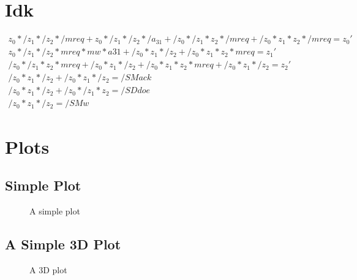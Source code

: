 \documentclass{scrartcl}
\begin{document}
\section{Idk}
\begin{align*}
    z_0*/z_1*/z_2*/mreq + z_0*/z_1*/z_2*/a_{31} + /z_0*/z_1*z_2*/mreq + /z_0*z_1*z_2*/mreq = z_0' \\
    z_0*/z_1*/z_2*mreq*mw*a31 + /z_0*z_1*/z_2 + /z_0*z_1*z_2*mreq = z_1' \\
    /z_0*/z_1*z_2*mreq + /z_0*z_1*/z_2 + /z_0*z_1*z_2*mreq + /z_0*z_1*/z_2 = z_2' \\
    /z_0*z_1*/z_2+/z_0*z_1*/z_2 = /SMack \\
    /z_0*z_1*/z_2+/z_0*/z_1*z_2 = /SDdoe \\
    /z_0*z_1*/z_2 = /SMw
\end{align*}

\section{Plots}
\subsection{Simple Plot}
\noindent
\FloatBarrier
\begin{figure}[ht]
        \centering
        \caption{A simple plot}
        \label{fig:simpleplot}
\end{figure}
\FloatBarrier

\subsection{A Simple 3D Plot}
\noindent
\FloatBarrier
\begin{figure}[ht]
        \centering
        \caption{A 3D plot}
        \label{plt:3dplot}
\end{figure}
\end{document}

